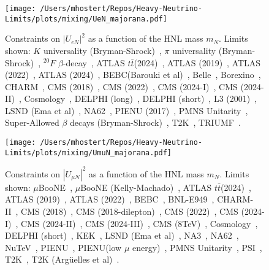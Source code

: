 \documentclass{revtex4-1}%
\begin{document}
%
\normalsize%


\begin{figure}[h!]%
\centering%
\texttt{[image: /Users/mhostert/Repos/Heavy-Neutrino-Limits/plots/mixing/UeN\_majorana.pdf]}%
\caption{Constraints on $|U_{e N}|^2$ as a function of the HNL mass $m_N$. Limits shown: $K$ universality (Bryman-Shrock)~\cite{Bryman:2019bjg}, $\pi$ universality (Bryman-Shrock)~\cite{Bryman:2019bjg}, $^{20}F$ $\beta$-decay~\cite{Deutsch:1990ut}, ATLAS $t\bar t$(2024)~\cite{ATLAS:2024fcs}, ATLAS (2019)~\cite{ATLAS:2019kpx}, ATLAS (2022)~\cite{ATLAS:2022atq}, ATLAS (2024)~\cite{ATLAS:2024erm}, BEBC(Barouki et al)~\cite{Barouki:2022bkt}, Belle~\cite{Belle:2013ytx}, Borexino~\cite{Borexino:2013bot}, CHARM~\cite{CHARM:1985nku}, CMS (2018)~\cite{CMS:2018iaf}, CMS (2022)~\cite{CMS:2022fut}, CMS (2024-I)~\cite{CMS:2024ake}, CMS (2024-II)~\cite{CMS:2024xdq}, Cosmology~\cite{Sabti:2020yrt}, DELPHI (long)~\cite{DELPHI:1996qcc}, DELPHI (short)~\cite{DELPHI:1996qcc}, L3 (2001)~\cite{L3:2001zfe}, LSND (Ema et al)~\cite{Ema:2023buz}, NA62~\cite{NA62:2020mcv}, PIENU (2017)~\cite{PIENU:2017wbj}, PMNS Unitarity~\cite{Blennow:2023mqx}, Super-Allowed $\beta$ decays (Bryman-Shrock)~\cite{Bryman:2019bjg}, T2K~\cite{T2K:2019jwa}, TRIUMF~\cite{Britton:1992xv}.}%
\end{figure}

%


\begin{figure}[h!]%
\centering%
\texttt{[image: /Users/mhostert/Repos/Heavy-Neutrino-Limits/plots/mixing/UmuN\_majorana.pdf]}%
\caption{Constraints on $|U_{\mu N}|^2$ as a function of the HNL mass $m_N$. Limits shown: $\mu$BooNE~\cite{MicroBooNE:2023icy}, $\mu$BooNE (Kelly-Machado)~\cite{Kelly:2021xbv}, ATLAS $t\bar t$(2024)~\cite{ATLAS:2024fcs}, ATLAS (2019)~\cite{ATLAS:2019kpx}, ATLAS (2022)~\cite{ATLAS:2022atq}, BEBC~\cite{WA66:1985mfx}, BNL-E949~\cite{E949:2014gsn}, CHARM-II~\cite{CHARMII:1994jjr}, CMS (2018)~\cite{CMS:2018iaf}, CMS (2018-dilepton)~\cite{CMS:2018jxx}, CMS (2022)~\cite{CMS:2022fut}, CMS (2024-I)~\cite{CMS:2024ake}, CMS (2024-II)~\cite{CMS:2024xdq}, CMS (2024-III)~\cite{CMS:2024ita}, CMS (8TeV)~\cite{CMS:2016aro}, Cosmology~\cite{Sabti:2020yrt}, DELPHI (short)~\cite{DELPHI:1996qcc}, KEK~\cite{Bryman:2019bjg}, LSND (Ema et al)~\cite{Ema:2023buz}, NA3~\cite{NA3:1986ahv}, NA62~\cite{NA62:2021bji}, NuTeV~\cite{NuTeV:1999kej}, PIENU~\cite{PIENU:2019usb}, PIENU(low $\mu$ energy)~\cite{PIENU:2019usb}, PMNS Unitarity~\cite{Blennow:2023mqx}, PSI~\cite{Daum:1987bg}, T2K~\cite{T2K:2019jwa}, T2K (Arg\"uelles et al)~\cite{Arguelles:2021dqn}.}%
\end{figure}
\end{document}
